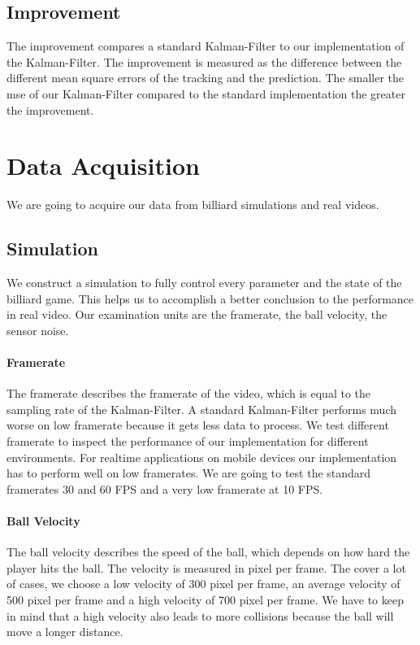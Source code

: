 \documentclass[titlepage, a4paper, 11pt]{scrartcl}
\begin{document}
\subsection{Improvement}

The improvement compares a standard Kalman-Filter to our implementation of the Kalman-Filter.
The improvement is measured as the difference between the different mean square errors of the tracking and the prediction.
The smaller the mse of our Kalman-Filter compared to the standard implementation the greater the improvement.

\section{Data Acquisition}

We are going to acquire our data from billiard simulations and real videos.

\subsection{Simulation}

We construct a simulation to fully control every parameter and the state of the billiard game.
This helps us to accomplish a better conclusion to the performance in real video.
Our examination units are the framerate, the ball velocity, the sensor noise.

\paragraph{Framerate}

The framerate describes the framerate of the video, which is equal to the sampling rate of the Kalman-Filter.
A standard Kalman-Filter performs much worse on low framerate because it gets less data to process.
We test different framerate to inspect the performance of our implementation for different environments.
For realtime applications on mobile devices our implementation has to perform well on low framerates.
We are going to test the standard framerates 30 and 60 FPS and a very low framerate at 10 FPS.

\paragraph{Ball Velocity}

The ball velocity describes the speed of the ball, which depends on how hard the player hits the ball.
The velocity is measured in pixel per frame.
The cover a lot of cases, we choose a low velocity of 300 pixel per frame, an average velocity of 500 pixel per frame and a high velocity of 700 pixel per frame.
We have to keep in mind that a high velocity also leads to more collisions because the ball will move a longer distance.
\end{document}
